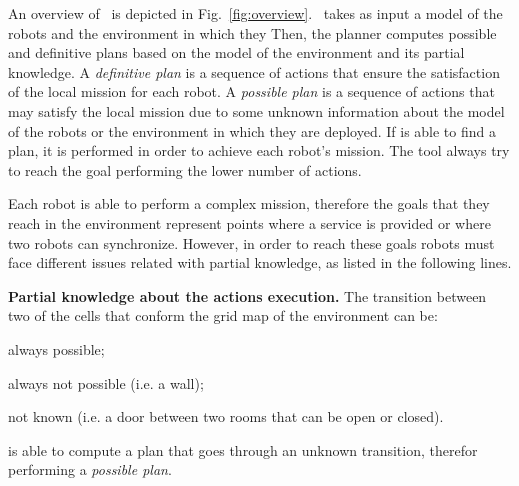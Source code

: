 
An overview of \toolName\ is depicted in Fig.~\ref{fig:overview}.
\toolName\ takes as input a model of the robots and the environment in which they
Then, the planner computes possible and definitive plans based on the model of the environment and its partial knowledge.
A \emph{definitive plan} is a sequence of actions that ensure the satisfaction of the local mission for each robot. 
A \emph{possible plan} is a sequence of actions that may satisfy the local mission due to some unknown information about the model of the robots or the environment in which they are deployed. 
If \toolName is able to find a plan, it is performed in order to achieve each robot's mission.
The tool always try to reach the goal performing the lower number of actions.

Each robot is able to perform a complex mission, therefore the goals that they reach in the environment represent points where a service is provided or where two robots can synchronize.
However, in order to reach these goals robots must face different issues related with partial knowledge, as listed in the following lines.

\textbf{Partial knowledge about the actions execution.} 
The transition between two of the cells that conform the grid map of the environment can be:
\begin{enumerate*}
\item always possible;
\item always not possible (i.e. a wall);
\item not known (i.e. a door between two rooms that can be open or closed).
\end{enumerate*}
\toolName is able to compute a plan that goes through an unknown transition, therefor performing a \emph{possible plan}.

